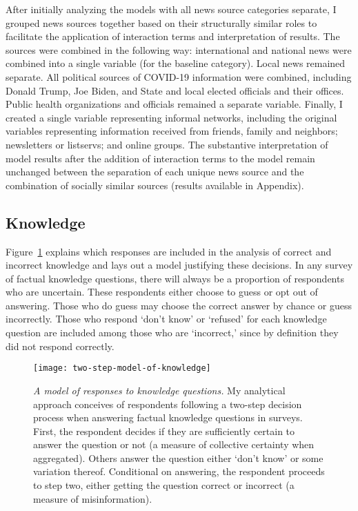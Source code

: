 \documentclass[11pt]{article}
\begin{document}
After initially analyzing the models with all news source categories separate, I grouped news sources together based on their structurally similar roles to facilitate the application of interaction terms and interpretation of results. The sources were combined in the following way: international and national news were combined into a single variable (for the baseline category). Local news remained separate. All political sources of COVID-19 information were combined, including Donald Trump, Joe Biden, and State and local elected officials and their offices. Public health organizations and officials remained a separate variable. Finally, I created a single variable representing informal networks, including the original variables representing information received from friends, family and neighbors; newsletters or listservs; and online groups. The substantive interpretation of model results after the addition of interaction terms to the model remain unchanged between the separation of each unique news source and the combination of socially similar sources (results available in Appendix).


\subsection{Knowledge}\label{sec:knowledge}

Figure~\ref{fig:TwoStepModelOfKnowledge} explains which responses are included in the analysis of correct and incorrect knowledge and lays out a model justifying these decisions. In any survey of factual knowledge questions, there will always be a proportion of respondents who are uncertain. These respondents either choose to guess or opt out of answering. Those who do guess may choose the correct answer by chance or guess incorrectly. Those who respond `don't know' or `refused' for each knowledge question are included among those who are `incorrect,' since by definition they did not respond correctly.


\begin{figure}[ht]
  \begin{center}
    \texttt{[image: two-step-model-of-knowledge]}
  \end{center}
  \caption[A model of responses to knowledge questions]
  {\emph{A model of responses to knowledge questions.}
   My analytical approach conceives of respondents following a two-step decision process when answering factual knowledge questions in surveys. First, the respondent decides if they are sufficiently certain to answer the question or not (a measure of collective certainty when aggregated). Others answer the question either `don't know' or some variation thereof. Conditional on answering, the respondent proceeds to step two, either getting the question correct or incorrect (a measure of misinformation).}
  \label{fig:TwoStepModelOfKnowledge}
\end{figure}
\end{document}

